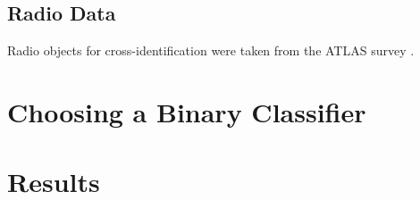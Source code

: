   \subsection{Radio Data}
  \label{ssec:radio-data}

    Radio objects for cross-identification were taken from the ATLAS survey \citep{franzen15}.

  \subsection{}

\section{Choosing a Binary Classifier}
\label{sec:binary-classifier}

\section{Results}
\label{sec:passive-results}

